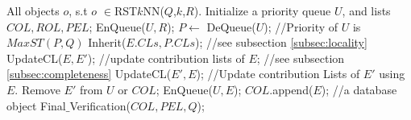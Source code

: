 \documentclass[prodmode,letterpaper]{acmsmall}
\newcommand{\rstknn}{RST$k$NN\xspace}
\begin{document}
\begin{spacing}{0.8}
\begin{algorithm}[tp]
\caption{\rstknn($R$: IUR-Tree root,$Q$: query) from \protect\cite{lu2011reverse}}
\begin{algorithmic}[1]
 All objects $o$, s.t $o$ $\in$\rstknn($Q$,$k$,$R$).
\State Initialize a priority queue $U$, and lists $COL, ROL, PEL$;
\State EnQueue($U,R$);
	\State $P \leftarrow$ DeQueue($U$); //Priority of $U$ is $MaxST(P,Q)$
		\State Inherit($E.CLs, P.CLs$);
			 //see subsection \ref{subsec:locality}
			\State UpdateCL($E,E'$); //update contribution lists of $E$;
			 //see subsection \ref{subsec:completeness}
			\EndIf
				\State UpdateCL($E',E$); //Update contribution Lists of $E'$ using $E$.
					\State Remove $E'$ from $U$ or $COL$;
				\EndIf
			\EndIf
					\State EnQueue($U,E$);
				\Else
					\State $COL$.append($E$); //a database object
				\EndIf
			\EndIf
			\EndFor
		\EndIf
	\EndFor
\EndWhile
\State Final$\_$Verification($COL,PEL,Q$);
\end{algorithmic}
\end{algorithm}
\end{spacing}
\end{document}
